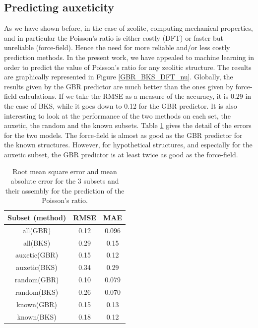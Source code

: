 \documentclass[journal=jacsat,manuscript=article]{achemso}
\begin{document}
\subsection{Predicting auxeticity}

As we have shown before, in the case of zeolite, computing mechanical properties, and in particular the Poisson's ratio is either costly (DFT) or faster but unreliable (force-field). Hence the need for more reliable and/or less costly prediction methods. In the present work,  we have appealed to machine learning in order to predict the value of Poisson's ratio for any zeolitic structure. The results are graphically represented in Figure \ref{GBR_BKS_DFT_nu}. Globally, the results given by the GBR predictor are much better than the ones given by force-field calculations. If we take the RMSE as a measure of the accuracy, it is 0.29 in the case of BKS, while it goes down to 0.12 for the GBR predictor. It is also interesting to look at the performance of the two methods on each set, the auxetic, the random and the known subsets. Table \ref{nu_gbr} gives the detail of the errors for the two models. The force-field is almost as good as the GBR predictor for the known structures. However, for hypothetical structures, and especially for the auxetic subset, the GBR predictor is at least twice as good as the force-field.
			
\begin{table}[ht]
\centering
\begin{tabular}{|c|c|c|}
\hline
Subset (method) & RMSE & MAE\\
\hline
all(GBR)  & 0.12 & 0.096      \\
all(BKS)& 0.29 & 0.15   \\
\hline
auxetic(GBR)  & 0.15  & 0.12     \\
auxetic(BKS)  & 0.34  & 0.29      \\
\hline
random(GBR)  & 0.10  & 0.079        \\
random(BKS)  & 0.26 & 0.070       \\
\hline
known(GBR)   & 0.15   & 0.13        \\
known(BKS)   & 0.18   & 0.12       \\
\hline
\end{tabular}
\caption{\label{nu_gbr} Root mean square error and mean absolute error for the 3 subsets and their assembly for the prediction of the Poisson's ratio.}
\end{table}
			
\end{document}
